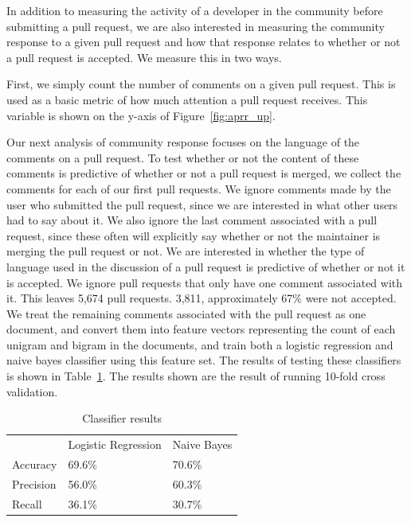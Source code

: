 \documentclass{iitthesis}
\begin{document}
In addition to measuring the activity of a developer in the community before
submitting a pull request, we are also interested in measuring the community
response to a given pull request and how that response relates to whether or not
a pull request is accepted. We measure this in two ways.

First, we simply count the number of comments on a given pull request. This is
used as a basic metric of how much attention a pull request receives. This
variable is shown on the y-axis of Figure~\ref{fig:aprr_up}.

Our next analysis of community response focuses on the language of the comments
on a pull request. To test whether or not the content of these comments is
predictive of whether or not a pull request is merged, we collect the comments
for each of our first pull requests. We ignore comments made by the user who
submitted the pull request, since we are interested in what other users had to
say about it. We also ignore the last comment associated with a pull request,
since these often will explicitly say whether or not the maintainer is merging
the pull request or not.  We are interested in whether the type of language used
in the discussion of a pull request is predictive of whether or not it is
accepted. We ignore pull requests that only have one comment associated with it.
This leaves 5,674 pull requests. 3,811, approximately 67\% were not accepted. We
treat the remaining comments associated with the pull request as one document,
and convert them into feature vectors representing the count of each unigram and
bigram in the documents, and train both a logistic regression and naive bayes
classifier using this feature set. The results of testing these classifiers is
shown in Table~\ref{tbl:classifiers}. The results shown are the result of
running 10-fold cross validation.

\begin{table}[ht] \centering \label{tbl:classifiers}
  \caption{Classifier results}
  \begin{tabular}{lll}
  \hline\hline
  ~         & Logistic Regression & Naive Bayes \\
  Accuracy  & 69.6\%              & 70.6\%      \\
  Precision & 56.0\%              & 60.3\%      \\
  Recall    & 36.1\%              & 30.7\%      \\
  \hline
  \end{tabular}
\end{table}
\end{document}
